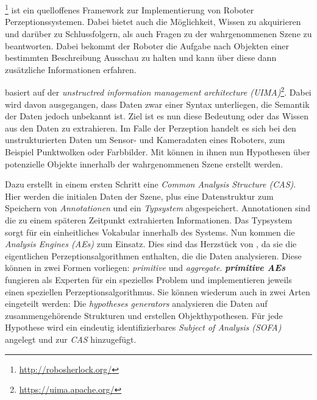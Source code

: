 \section{\robosherlock}
\label{sec:robosherlock}
\robosherlock\footnote{\url{http://robosherlock.org/}} ist ein quelloffenes Framework zur Implementierung von Roboter Perzeptionssystemen. Dabei bietet \robosherlock auch die Möglichkeit, Wissen zu akquirieren und darüber zu Schlussfolgern, als auch Fragen zu der wahrgenommenen Szene zu beantworten. Dabei bekommt der Roboter die Aufgabe nach Objekten einer bestimmten Beschreibung Ausschau zu halten und kann über diese dann zusätzliche Informationen erfahren\cite{robosherlock}. \par
\robosherlock basiert auf der \textit{unstructred information management architecture (UIMA)}\footnote{\url{https://uima.apache.org/}}. Dabei wird davon ausgegangen, dass Daten zwar einer Syntax unterliegen, die Semantik der Daten jedoch unbekannt ist. Ziel ist es nun diese Bedeutung oder das Wissen aus den Daten zu extrahieren.  Im Falle der Perzeption handelt es sich bei den unstrukturierten Daten um Sensor- und Kameradaten eines Roboters, zum Beispiel Punktwolken oder Farbbilder. Mit \robosherlock können in ihnen nun Hypothesen über potenzielle Objekte innerhalb der wahrgenommenen Szene erstellt werden. \par
Dazu erstellt \robosherlock in einem ersten Schritt eine \textit{Common Analysis Structure (CAS)}. Hier werden die initialen Daten der Szene, plus eine Datenstruktur zum Speichern von \textit{Annotationen} und ein \textit{Typsystem} abgespeichert. Annotationen sind die zu einem späteren Zeitpunkt extrahierten Informationen. Das Typsystem sorgt für ein einheitliches Vokabular innerhalb des Systems. \newline
{}Nun kommen die \textit{Analysis Engines (AEs)} zum Einsatz. Dies sind das Herzstück von \robosherlock, da sie die eigentlichen Perzeptionsalgorithmen enthalten, die die Daten analysieren. Diese können in zwei Formen vorliegen: \textit{primitive} und \textit{aggregate}. \newline 
\textbf{\textit{primitive AEs}} fungieren als Experten für ein spezielles Problem und implementieren jeweils einen speziellen Perzeptionsalgorithmus. Sie können wiederum auch in zwei Arten eingeteilt werden:\newline
Die \textit{hypotheses generators} analysieren die Daten auf zusammengehörende Strukturen und erstellen Objekthypothesen. Für jede Hypothese wird ein eindeutig identifizierbares \textit{Subject of Analysis (SOFA)} angelegt und zur \textit{CAS} hinzugefügt. \newline

